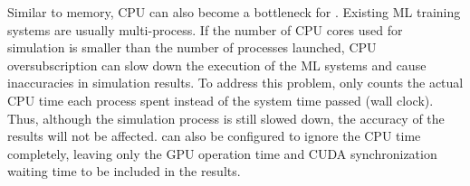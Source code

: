  Similar to memory, CPU can also become a bottleneck for \sys. Existing ML training systems are usually multi-process. If the number of CPU cores used for simulation is smaller than the number of processes launched, CPU oversubscription can slow down the execution of the ML systems and cause inaccuracies in simulation results. To address this problem, \sys only counts the actual CPU time each process spent instead of the system time passed (wall clock). Thus, although the simulation process is still slowed down, the accuracy of the results will not be affected. \sys can also be configured to ignore the CPU time completely, leaving only the GPU operation time and CUDA synchronization waiting time to be included in the results.

